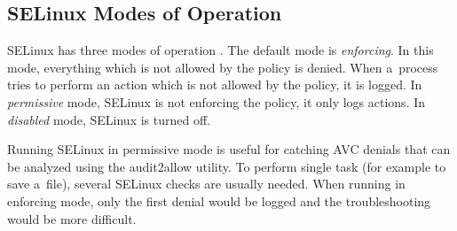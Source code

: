 \subsection{SELinux Modes of Operation}

SELinux has three modes of operation \cite{selinuxguide}. The default mode is
\emph{enforcing}. In this mode, everything which is not allowed by the policy is
denied. When a~process tries to perform an action which is not allowed by the
policy, it is logged. In \emph{permissive} mode, SELinux is not enforcing the
policy, it only logs actions. In \emph{disabled} mode, SELinux is turned off.

Running SELinux in permissive mode is useful for catching AVC denials that can
be analyzed using the audit2allow utility. To perform single task (for example
to save a~file), several SELinux checks are usually needed. When running in
enforcing mode, only the first denial would be logged and the troubleshooting
would be more difficult.

